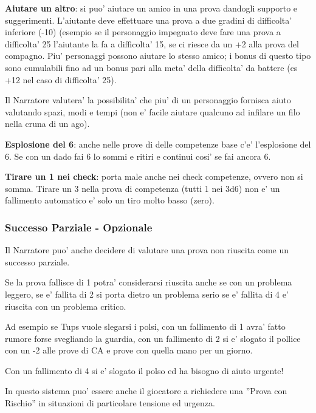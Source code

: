 \documentclass[a4paper,11pt,twoside,openany]{book}
\begin{document}
\textbf{Aiutare un altro}: si puo' aiutare un amico in una prova dandogli supporto e suggerimenti. L'aiutante deve effettuare una prova a due gradini di difficolta' inferiore (-10) (esempio se il personaggio impegnato deve fare una prova a difficolta' 25 l'aiutante la fa a difficolta' 15, se ci riesce da un +2 alla prova del compagno. Piu' personaggi possono aiutare lo stesso amico; i bonus di questo tipo sono cumulabili fino ad un bonus pari alla meta' della difficolta' da battere (es +12 nel caso di difficolta' 25).

Il Narratore valutera' la possibilita' che piu' di un personaggio fornisca aiuto valutando spazi, modi e tempi (non e' facile aiutare qualcuno ad infilare un filo nella cruna di un ago).

\textbf{Esplosione del 6}: anche nelle prove di delle competenze base c'e' l'esplosione del 6. Se con un dado fai 6 lo sommi e ritiri e continui cosi' se fai ancora 6.

\textbf{Tirare un 1 nei check}: porta male anche nei check competenze, ovvero non si somma. Tirare un 3 nella prova di competenza (tutti 1 nei 3d6) non e' un fallimento automatico e' solo un tiro molto basso (zero).

\subsubsection{Successo Parziale - Opzionale}

Il Narratore puo' anche decidere di valutare una prova non riuscita come un successo parziale.

Se la prova fallisce di 1 potra' considerarsi riuscita anche se con un problema leggero, se e' fallita di 2 si porta dietro un problema serio se e' fallita di 4 e' riuscita con un problema critico.

Ad esempio se Tups vuole slegarsi i polsi, con un fallimento di 1 avra' fatto rumore forse svegliando la guardia, con un fallimento di 2 si e' slogato il pollice con un -2 alle prove di CA e prove con quella mano per un giorno.

Con un fallimento di 4 si e' slogato il polso ed ha bisogno di aiuto urgente!

In questo sistema puo' essere anche il giocatore a richiedere una ''Prova con Rischio'' in situazioni di particolare tensione ed urgenza.

\pagebreak
\end{document}
